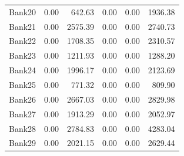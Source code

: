 \begin{longtable}{@{}lrrrrr@{}}
Bank20 & 0.00 & 642.63 & 0.00 & 0.00 & 1936.38 \\
Bank21 & 0.00 & 2575.39 & 0.00 & 0.00 & 2740.73 \\
Bank22 & 0.00 & 1708.35 & 0.00 & 0.00 & 2310.57 \\
Bank23 & 0.00 & 1211.93 & 0.00 & 0.00 & 1288.20 \\
Bank24 & 0.00 & 1996.17 & 0.00 & 0.00 & 2123.69 \\
Bank25 & 0.00 & 771.32 & 0.00 & 0.00 & 809.90 \\
Bank26 & 0.00 & 2667.03 & 0.00 & 0.00 & 2829.98 \\
Bank27 & 0.00 & 1913.29 & 0.00 & 0.00 & 2052.97 \\
Bank28 & 0.00 & 2784.83 & 0.00 & 0.00 & 4283.04 \\
Bank29 & 0.00 & 2021.15 & 0.00 & 0.00 & 2629.44 \\
\end{longtable}

